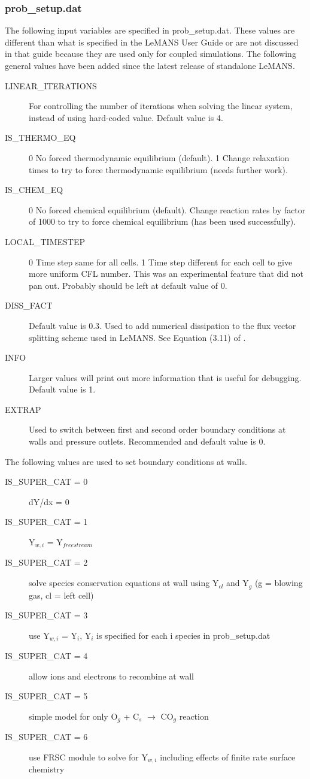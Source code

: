 \documentclass[]{article}
\begin{document}
\subsubsection{prob\_setup.dat}
The following input variables are specified in prob\_setup.dat.  These values are different than what is specified in the LeMANS User Guide or are not discussed in that guide because they are used only for coupled simulations.
\newline
\newline
\noindent The following general values have been added since the latest release of standalone LeMANS.
\begin{description}
 \item [LINEAR\_ITERATIONS] For controlling the number of iterations when solving the linear system, instead of using hard-coded value.  Default value is 4.
 \item [IS\_THERMO\_EQ] 0 No forced thermodynamic equilibrium (default).  1 Change relaxation times to try to force thermodynamic equilibrium (needs further work).
 \item [IS\_CHEM\_EQ] 0 No forced chemical equilibrium (default).  Change reaction rates by factor of 1000 to try to force chemical equilibrium (has been used successfully).
 \item [LOCAL\_TIMESTEP] 0  Time step same for all cells.  1 Time step different for each cell to give more uniform CFL number. This was an experimental feature that did not pan out.  Probably should be left at default value of 0.
 \item [DISS\_FACT] Default value is 0.3.  Used to add numerical dissipation to the flux vector splitting scheme used in LeMANS.  See Equation (3.11) of \cite{scalabrin_thesis}.
 \item [INFO] Larger values will print out more information that is useful for debugging. Default value is 1.
 \item [EXTRAP] Used to switch between first and second order boundary conditions at walls and pressure outlets.  Recommended and default value is 0.
\end{description}

\noindent The following values are used to set boundary conditions at walls.
\begin{description}
\item[IS\_SUPER\_CAT = 0] dY/dx = 0
\item[IS\_SUPER\_CAT = 1] Y$_{w,i}$ = Y$_{freestream}$
\item[IS\_SUPER\_CAT = 2] solve species conservation equations at wall using Y$_{cl}$ and Y$_g$ (g = blowing gas, cl = left cell)
\item[IS\_SUPER\_CAT = 3] use Y$_{w,i}$ = Y$_i$, Y$_i$ is specified for each i species in prob\_setup.dat
\item[IS\_SUPER\_CAT = 4] allow ions and electrons to recombine at wall
\item[IS\_SUPER\_CAT = 5] simple model for only O$_g$ + C$_s$ $\rightarrow$ CO$_g$ reaction
\item[IS\_SUPER\_CAT = 6] use FRSC module to solve for Y$_{w,i}$ including effects of finite rate surface chemistry
\end{description} 
\end{document}

